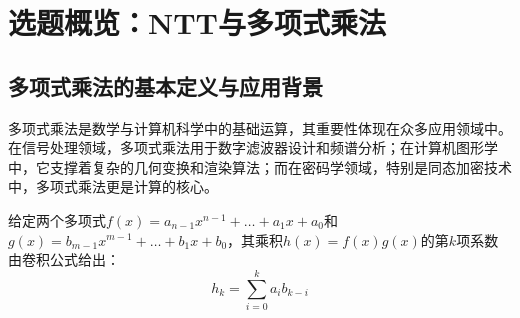 \documentclass[a4paper]{article}
\begin{document}
\begin{abstract}
多项式乘法是同态加密、数字信号处理等领域的核心算子，而数论变换（NTT）是将其复杂度从 $O(n^2)$ 降至 $O(n\log n)$ 的关键算法。本报告系统梳理了 SIMD、OpenMP、MPI、CUDA 四级并行优化的完整实验过程，并最终构建了一个统一框架，支持三种模运算实现（朴素、Montgomery、Barrett）与四种并行策略（串行、OpenMP、MPI、GPU）的任意组合。

在过去的实验中，我们在 SIMD 实验中实现了 ARM NEON 向量化与 Montgomery 规约，为后续并行化奠定了高效标量运算基础。随后，OpenMP 多线程实验在中等规模数据上实现 2–3 倍加速；MPI 实验则验证了 CRT 划分在分布式场景下的可行性，为 u64 精度扩展提供了设计样板；GPU 实验通过"线程级蝶形 + 共享内存 + 预计算旋转因子"把运行时间压缩到十微秒级，在 $n=131072$ 时较串行快 6.5 倍。

统一性能测试显示：GPU 始终是大规模数据的首选；OpenMP 在 $1024<n\le8192$ 区间性价比最高；串行 Montgomery 适合 $n\le1024$ 的小数据；MPI 当前实现仅用于展示算法间差异。基于此，我们提出了一套动态调度策略，可根据数据规模自动切换最优实现。

尾声部分回顾了各实验的技术收获与遗憾，并展望了未来方向。实验结果证明，面向硬件特性与算法结构的协同优化，能为高性能多项式乘法提供数量级的性能提升。
\end{abstract}
\clearpage
\tableofcontents
\newpage

\section{选题概览：NTT与多项式乘法}

\subsection{多项式乘法的基本定义与应用背景}


多项式乘法是数学与计算机科学中的基础运算，其重要性体现在众多应用领域中。在信号处理领域，多项式乘法用于数字滤波器设计和频谱分析；在计算机图形学中，它支撑着复杂的几何变换和渲染算法；而在密码学领域，特别是同态加密技术中，多项式乘法更是计算的核心。

给定两个多项式$f(x) = a_{n-1}x^{n-1} + \ldots + a_1x + a_0$和$g(x) = b_{m-1}x^{m-1} + \ldots + b_1x + b_0$，其乘积$h(x) = f(x)g(x)$的第$k$项系数由卷积公式给出：
$$h_k = \sum_{i=0}^{k} a_i b_{k-i}$$
\end{document}
